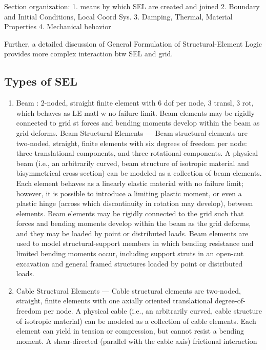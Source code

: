 \documentclass[a4paper, nobind]{templates/ociamthesis}
\providecommand{\tightlist}{%
  \setlength{\itemsep}{0pt}\setlength{\parskip}{0pt}}
\begin{document}
Section organization: 1. means by which SEL are created and joined 2.
Boundary and Initial Conditions, Local Coord Sys. 3. Damping, Thermal,
Material Properties 4. Mechanical behavior

Further, a detailed discussion of General Formulation of
Structural-Element Logic provides more complex interaction btw SEL and
grid.

\hypertarget{types-of-sel}{%
\subsection{Types of SEL}\label{types-of-sel}}

\begin{enumerate}
\def\labelenumi{\arabic{enumi}.}
\tightlist
\item
  Beam : 2-noded, straight finite element with 6 dof per node, 3
  transl, 3 rot, which behaves as LE matl w no failure limit. Beam
  elements may be rigidly connected to grid st forces and bending
  moments develop within the beam as grid deforms. Beam Structural
  Elements --- Beam structural elements are two-noded, straight,
  finite elements with six degrees of freedom per node: three
  translational components, and three rotational components. A
  physical beam (i.e., an arbitrarily curved, beam structure of
  isotropic material and bisymmetrical cross-section) can be modeled
  as a collection of beam elements. Each element behaves as a linearly
  elastic material with no failure limit; however, it is possible to
  introduce a limiting plastic moment, or even a plastic hinge (across
  which discontinuity in rotation may develop), between elements. Beam
  elements may be rigidly connected to the grid such that forces and
  bending moments develop within the beam as the grid deforms, and
  they may be loaded by point or distributed loads. Beam elements are
  used to model structural-support members in which bending resistance
  and limited bending moments occur, including support struts in an
  open-cut excavation and general framed structures loaded by point or
  distributed loads.
\item
  Cable Structural Elements --- Cable structural elements are
  two-noded, straight, finite elements with one axially oriented
  translational degree-of-freedom per node. A physical cable (i.e., an
  arbitrarily curved, cable structure of isotropic material) can be
  modeled as a collection of cable elements. Each element can yield in
  tension or compression, but cannot resist a bending moment. A
  shear-directed (parallel with the cable axis) frictional interaction

\end{enumerate}
\end{document}

